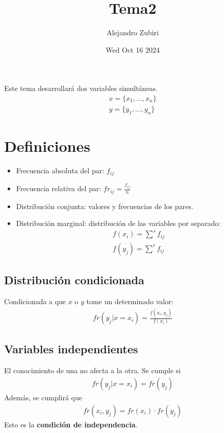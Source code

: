 \documentclass{article}
\author{Alejandro Zubiri}
\date{Wed Oct 16 2024}
\title{Tema2}
\begin{document}
\maketitle
\tableofcontents
\pagebreak
Este tema desarrollará dos variables simultáneas.\\
\begin{equation}
    \begin{split}
        x=\{ x_{1},\dots,x_{n} \}\\
        y=\{ y_{1},\dots, y_{n} \}
    \end{split}
\end{equation}
\section{Definiciones}
\begin{itemize}
    \item Frecuencia absoluta del par: $f_{ij}$
    \item Frecuencia relativa del par: $fr_{ij}= \frac{f_{ij}}{n}$
    \item Distribución conjunta: valores y frecuencias de los pares.
    \item Distribución marginal: distribución de las variables por separado:
    \begin{equation}
        \begin{split}
            f(x_{i})= \sum ^s f_{ij}\\
            f(y_{j})= \sum ^r f_{ij}
        \end{split}
    \end{equation}
\end{itemize}
\subsection{Distribución condicionada}
Condicionada a que $x$ o $y$ tome un determinado valor:
\begin{equation}
    \begin{split}
        fr(y_{j}| x=x_{i})= \frac{f(x_{i}, y_{j})}{f(x_{i})}
    \end{split}
\end{equation}
\subsection{Variables independientes}
El conocimiento de una no afecta a la otra. Se cumple si
\begin{equation}
    \begin{split}
        fr(y_{j}|x=x_{i})=fr(y_{j})
    \end{split}
\end{equation}
Además, se cumplirá que
\begin{equation}
    \begin{split}
        fr(x_{i},y_{j})=fr(x_{i})\cdot fr(y_{j})
    \end{split}
\end{equation}
Esto es la \textbf{condición de independencia}.
\end{document}
